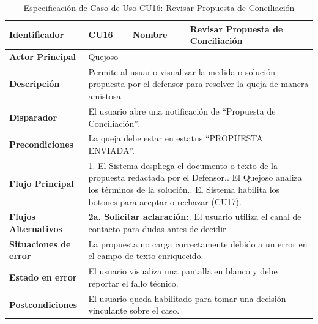 \begingroup
\setlength{\parskip}{0pt}
\begin{longtable}{|p{3.5cm}|p{2cm}|p{2.5cm}|p{7cm}|}
\caption{Especificación de Caso de Uso CU16: Revisar Propuesta de Conciliación}
\label{tab:cu16_revisar_propuesta} \\
\hline
\textbf{Identificador} & CU16 & \textbf{Nombre} & Revisar Propuesta de Conciliación \\ \hline
\textbf{Actor Principal} & \multicolumn{3}{p{11.5cm}|}{Quejoso} \\ \hline
\textbf{Descripción} & \multicolumn{3}{p{11.5cm}|}{Permite al usuario visualizar la medida o solución propuesta por el defensor para resolver la queja de manera amistosa.} \\ \hline
\textbf{Disparador} & \multicolumn{3}{p{11.5cm}|}{El usuario abre una notificación de ``Propuesta de Conciliación''.} \\ \hline
\textbf{Precondiciones} & \multicolumn{3}{p{11.5cm}|}{La queja debe estar en estatus ``PROPUESTA ENVIADA''.} \\ \hline
\textbf{Flujo Principal} & \multicolumn{3}{p{11.5cm}|}{1. El Sistema despliega el documento o texto de la propuesta redactada por el Defensor.\newline 2. El Quejoso analiza los términos de la solución.\newline 3. El Sistema habilita los botones para aceptar o rechazar (CU17).} \\ \hline
\textbf{Flujos Alternativos} & \multicolumn{3}{p{11.5cm}|}{\textbf{2a. Solicitar aclaración:}\newline 1. El usuario utiliza el canal de contacto para dudas antes de decidir.} \\ \hline
\textbf{Situaciones de error} & \multicolumn{3}{p{11.5cm}|}{La propuesta no carga correctamente debido a un error en el campo de texto enriquecido.} \\ \hline
\textbf{Estado en error} & \multicolumn{3}{p{11.5cm}|}{El usuario visualiza una pantalla en blanco y debe reportar el fallo técnico.} \\ \hline
\textbf{Postcondiciones} & \multicolumn{3}{p{11.5cm}|}{El usuario queda habilitado para tomar una decisión vinculante sobre el caso.} \\ \hline
\end{longtable}
\endgroup

\vspace{0.8cm}

